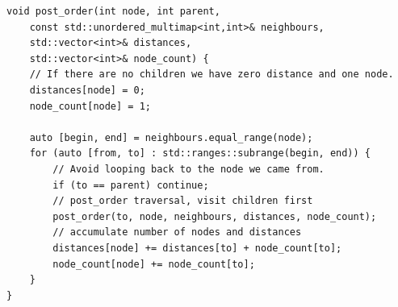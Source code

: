 \documentclass[aspectratio=169]{beamer}
\begin{document}
\begin{frame}[fragile]{}
\small
\begin{verbatim}
void post_order(int node, int parent, 
    const std::unordered_multimap<int,int>& neighbours, 
    std::vector<int>& distances,
    std::vector<int>& node_count) {
    // If there are no children we have zero distance and one node.
    distances[node] = 0;
    node_count[node] = 1;

    auto [begin, end] = neighbours.equal_range(node);
    for (auto [from, to] : std::ranges::subrange(begin, end)) {
        // Avoid looping back to the node we came from.
        if (to == parent) continue;
        // post_order traversal, visit children first
        post_order(to, node, neighbours, distances, node_count);
        // accumulate number of nodes and distances
        distances[node] += distances[to] + node_count[to];
        node_count[node] += node_count[to];
    }
}
\end{verbatim}
\end{frame}

\begin{frame}{}
\end{frame}

\begin{frame}{}
\end{frame}
\end{document}
